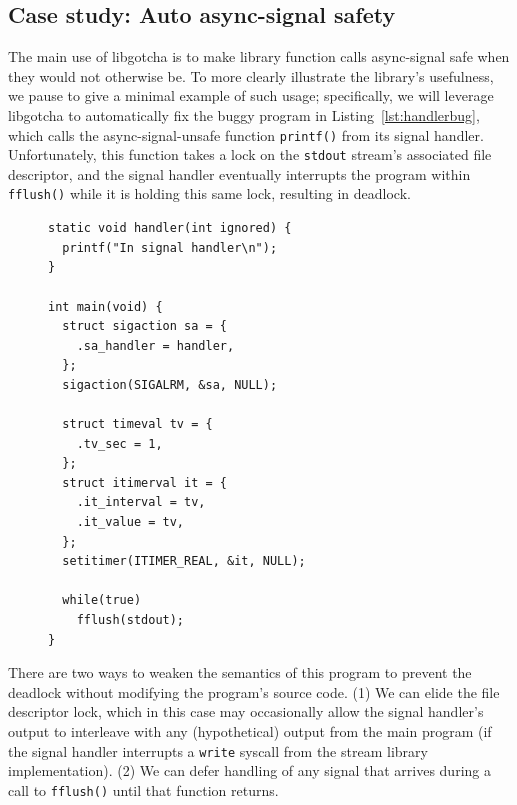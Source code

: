 \subsection{Case study: Auto async-signal safety}
\label{sec:statefulness}

The main use of libgotcha is to make library function calls async-signal safe when
they would not otherwise be.  To more clearly illustrate the library's usefulness, we
pause to give a minimal example of such usage; specifically, we will leverage
libgotcha to automatically fix the buggy program in Listing~\ref{lst:handlerbug},
which calls the async-signal-unsafe function \texttt{printf()} from its signal
handler.  Unfortunately, this function takes a lock on the \texttt{stdout} stream's
associated file descriptor, and the signal handler eventually interrupts the program
within \texttt{fflush()} while it is holding this same lock, resulting in deadlock.

\begin{figure}
\begin{lstlisting}[label=lst:handlerbug,caption=C program with a buggy signal handler]
static void handler(int ignored) {
  printf("In signal handler\n");
}

int main(void) {
  struct sigaction sa = {
    .sa_handler = handler,
  };
  sigaction(SIGALRM, &sa, NULL);

  struct timeval tv = {
    .tv_sec = 1,
  };
  struct itimerval it = {
    .it_interval = tv,
    .it_value = tv,
  };
  setitimer(ITIMER_REAL, &it, NULL);

  while(true)
    fflush(stdout);
}
\end{lstlisting}
\end{figure}

There are two ways to weaken the semantics of this program to prevent the deadlock
without modifying the program's source code.  (1) We can elide the file descriptor
lock, which in this case may occasionally allow the signal handler's output to
interleave with any (hypothetical) output from the main program (if the signal
handler interrupts a \texttt{write} syscall from the stream library implementation).
(2) We can defer handling of any signal that arrives during a call to
\texttt{fflush()} until that function returns.

